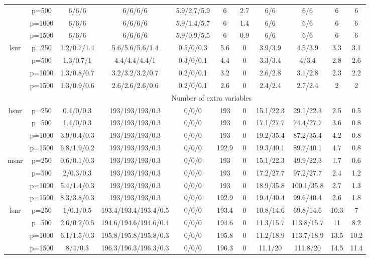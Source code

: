 \begin{table}[ht]
{\begin{tabular}{|c|c|ccccccccc|}
   & p=500 & 6/6/6 & 6/6/6/6 & 5.9/2.7/5.9 & 6 & 2.7 & 6/6 & 6/6 & 6 & 6 \\ 
   & p=1000 & 6/6/6 & 6/6/6/6 & 5.9/1.4/5.7 & 6 & 1.4 & 6/6 & 6/6 & 6 & 6 \\ 
   & p=1500 & 6/6/6 & 6/6/6/6 & 5.9/0.9/5.5 & 6 & 0.9 & 6/6 & 6/6 & 6 & 6 \\ 
  \midrule\multirow{4}[2]{*}{lsnr} & p=250 & 1.2/0.7/1.4 & 5.6/5.6/5.6/1.4 & 0.5/0/0.3 & 5.6 & 0 & 3.9/3.9 & 4.5/3.9 & 3.3 & 3.1 \\ 
   & p=500 & 1.3/0.7/1 & 4.4/4.4/4.4/1 & 0.3/0/0.1 & 4.4 & 0 & 3.3/3.4 & 4/3.4 & 2.8 & 2.6 \\ 
   & p=1000 & 1.3/0.8/0.7 & 3.2/3.2/3.2/0.7 & 0.2/0/0.1 & 3.2 & 0 & 2.6/2.8 & 3.1/2.8 & 2.3 & 2.2 \\ 
   & p=1500 & 1.3/0.9/0.6 & 2.6/2.6/2.6/0.6 & 0.2/0/0.1 & 2.6 & 0 & 2.4/2.4 & 2.7/2.4 & 2 & 2 \\ 
   \midrule 
 \multicolumn{1}{|c}{} &       & \multicolumn{9}{c|}{Number of extra variables} \\
\midrule\multirow{4}[2]{*}{hsnr} & p=250 & 0.4/0/0.3 & 193/193/193/0.3 & 0/0/0 & 193 & 0 & 15.1/22.3 & 29.1/22.3 & 2.5 & 0.5 \\ 
   & p=500 & 1.4/0/0.3 & 193/193/193/0.3 & 0/0/0 & 193 & 0 & 17.1/27.7 & 74.4/27.7 & 3.6 & 0.8 \\ 
   & p=1000 & 3.9/0.4/0.3 & 193/193/193/0.3 & 0/0/0 & 193 & 0 & 19.2/35.4 & 87.2/35.4 & 4.2 & 0.8 \\ 
   & p=1500 & 6.8/1.9/0.2 & 193/193/193/0.3 & 0/0/0 & 192.9 & 0 & 19.3/40.1 & 89.7/40.1 & 4.7 & 0.8 \\ 
  \midrule\multirow{4}[2]{*}{msnr} & p=250 & 0.6/0.1/0.3 & 193/193/193/0.3 & 0/0/0 & 193 & 0 & 15.1/22.3 & 49.9/22.3 & 1.7 & 0.6 \\ 
   & p=500 & 2/0.3/0.3 & 193/193/193/0.3 & 0/0/0 & 193 & 0 & 17.2/27.7 & 97.2/27.7 & 2.4 & 1.2 \\ 
   & p=1000 & 5.4/1.4/0.3 & 193/193/193/0.3 & 0/0/0 & 193 & 0 & 18.9/35.8 & 100.1/35.8 & 2.7 & 1.3 \\ 
   & p=1500 & 8.3/3.8/0.3 & 193/193/193/0.3 & 0/0/0 & 192.9 & 0 & 19.4/40.4 & 99.6/40.4 & 2.6 & 1.8 \\ 
  \midrule\multirow{4}[2]{*}{lsnr} & p=250 & 1/0.1/0.5 & 193.4/193.4/193.4/0.5 & 0/0/0 & 193.4 & 0 & 10.8/14.6 & 69.8/14.6 & 10.3 & 7 \\ 
   & p=500 & 2.6/0.2/0.5 & 194.6/194.6/194.6/0.4 & 0/0/0 & 194.6 & 0 & 11.3/15.7 & 113.8/15.7 & 11 & 8.2 \\ 
   & p=1000 & 6.1/1.5/0.3 & 195.8/195.8/195.8/0.3 & 0/0/0 & 195.8 & 0 & 11.2/18.9 & 113.7/18.9 & 13.5 & 10.2 \\ 
   & p=1500 & 8/4/0.3 & 196.3/196.3/196.3/0.3 & 0/0/0 & 196.3 & 0 & 11.1/20 & 111.8/20 & 14.5 & 11.4 \\ 
   \bottomrule 
\end{tabular}
}
\end{table}
